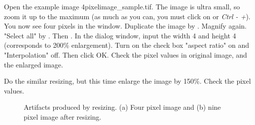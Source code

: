 \begin{indentexercise}{1}
Open the example image
4pixelimage\_sample.tif. The image is ultra small, so zoom it
up to the maximum (as much as you can, you must click on or
\textit{Ctrl - +}). You now see four pixels in the window.
Duplicate the image by .
Magnify again. "Select all" by
.
Then .
In the dialog window, input the width 4 and height 4 (corresponds to
200\% enlargement). Turn on the check box "aspect
ratio" on and
"Interpolation" off. Then click
OK. Check the pixel values in original image, and the enlarged image.
\end{indentexercise}

\begin{indentexercise}{2}
Do the similar resizing, but this time enlarge
the image by 150\%. Check the pixel values.
\begin{figure}[htbp]
\centering
{}
\caption{ Artifacts produced by resizing. (a) Four pixel image and (b) nine pixel image after
resizing. }
\label{fig:resizing}
\end{figure} 

\end{indentexercise}

